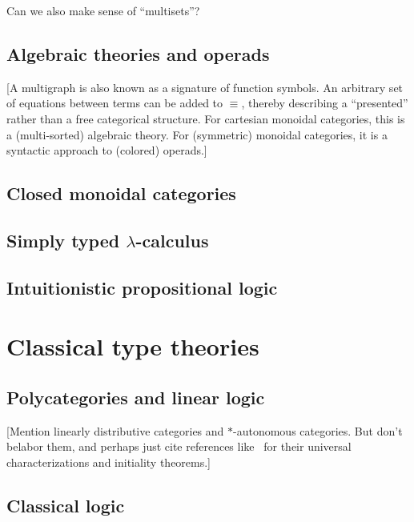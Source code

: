 \documentclass{book}
\begin{document}
Can we also make sense of ``multisets''?


\section{Algebraic theories and operads}
\label{sec:algthy-opd}

[A multigraph is also known as a signature of function symbols.  An arbitrary set of equations between terms can be added to $\equiv$, thereby describing a ``presented'' rather than a free categorical structure.  For cartesian monoidal categories, this is a (multi-sorted) algebraic theory.  For (symmetric) monoidal categories, it is a syntactic approach to (colored) operads.]


\section{Closed monoidal categories}
\label{sec:clmoncat}


\section{Simply typed $\lambda$-calculus}
\label{sec:stlc}


\section{Intuitionistic propositional logic}
\label{sec:int-logic}


\chapter{Classical type theories}
\label{chap:polycats}



\section{Polycategories and linear logic}
\label{sec:cllin}

[Mention linearly distributive categories and $\ast$-autonomous categories.
But don't belabor them, and perhaps just cite references like~\cite{cs:wkdistrib} for their universal characterizations and initiality theorems.]


\section{Classical logic}
\label{sec:classical}
\end{document}

